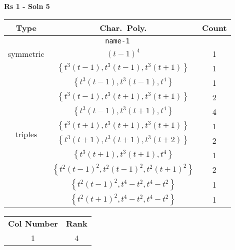 \documentclass{article}
\begin{document}
    
    \textbf{Rs 1 - Soln 5}
    \begin{table}
    \begin{tabular}{|c|c|c|}
    \hline
    \textbf{Type} & \textbf{Char.~Poly.} & \textbf{Count} \\
    \hline \multicolumn{3}{|c|}{\texttt{name-1}} \\ \hline
    \multirow{1}{*}{symmetric}
     & $(t - 1)^4$ & 1 \\
    \hline
    \multirow{10}{*}{triples}
     & $\left\{t^3(t - 1),t^3(t - 1),t^3(t + 1)\right\}$ & 1 \\
     & $\left\{t^3(t - 1),t^3(t - 1),t^4\right\}$ & 1 \\
     & $\left\{t^3(t - 1),t^3(t + 1),t^3(t + 1)\right\}$ & 2 \\
     & $\left\{t^3(t - 1),t^3(t + 1),t^4\right\}$ & 4 \\
     & $\left\{t^3(t + 1),t^3(t + 1),t^3(t + 1)\right\}$ & 1 \\
     & $\left\{t^3(t + 1),t^3(t + 1),t^3(t + 2)\right\}$ & 2 \\
     & $\left\{t^3(t + 1),t^3(t + 1),t^4\right\}$ & 1 \\
     & $\left\{t^2(t - 1)^2,t^2(t - 1)^2,t^2(t + 1)^2\right\}$ & 2 \\
     & $\left\{t^2(t - 1)^2,t^4 - t^2,t^4 - t^2\right\}$ & 1 \\
     & $\left\{t^2(t + 1)^2,t^4 - t^2,t^4 - t^2\right\}$ & 1 \\
    \hline
    \end{tabular}
    \end{table}
    \begin{table}
    \begin{tabular}{|c|c|}
    \hline
    \textbf{Col Number} & \textbf{Rank}\\
    1 & 4 \\ 
    \hline
    \end{tabular}
    \end{table}
    \newpage
    
\end{document}
